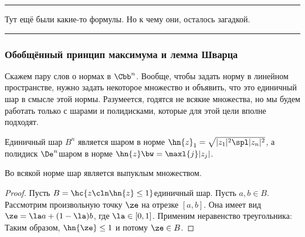 \documentclass[a4paper]{article}
\newenvironment{petit}
{\par\smallskip\hrule\smallskip\footnotesize}{\par\smallskip\hrule\smallskip}
\begin{document}
\begin{petit}
Тут ещё были какие-то формулы. Но к чему они, осталось загадкой.
\end{petit}


\subsubsection{Обобщённый принцип максимума и лемма Шварца}

Скажем пару слов о нормах в $\Cbb^n$. Вообще, чтобы задать норму в линейном пространстве,
нужно задать некоторое множество и объявить, что это единичный шар в смысле этой нормы.
Разумеется, годятся не всякие множества, но мы будем работать только с шарами и полидисками,
которые для этой цели вполне подходят.

Единичный шар $B^n$ является шаром в норме $\hn{z}_1 = \sqrt{|z_1|^2\spl|z_n|^2}$, а
полидиск $\De^n$\т шаром в норме $\hn{z} \bw= \maxl{j} |z_j|$.

\begin{lemma}
Во всякой норме шар является выпуклым множеством.
\end{lemma}
\begin{proof}
Пусть $B = \hc{z\cln \hn{z} \le 1}$\т единичный шар. Пусть $a, b \in B$. Рассмотрим произвольную точку
$\ze$ на отрезке $[a,b]$. Она имеет вид $\ze = \la a + (1-\la) b$, где $\la \in [0,1]$.
Применим неравенство треугольника:
Таким образом, $\hn{\ze} \le 1$ и потому $\ze \in B$.
\end{proof}
\end{document}
